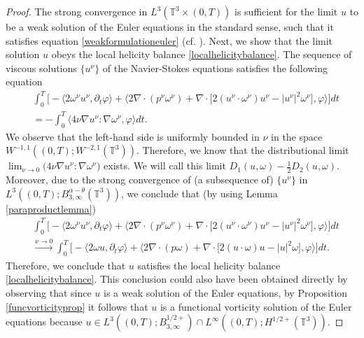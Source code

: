 \documentclass[12pt,a4paper]{article}
\theoremstyle{definition}
\theoremstyle{remark}
\numberwithin{equation}{section}
\begin{document}
\begin{proof}
The strong convergence in $L^3 (\mathbb{T}^3 \times (0,T))$ is sufficient for the limit $u$ to be a weak solution of the Euler equations in the standard sense, such that it satisfies equation \eqref{weakformulationeuler} (cf. \cite{duchon,drivaseyink}). Next, we show that the limit solution $u$ obeys the local helicity balance \eqref{localhelicitybalance}. The sequence of viscous solutions $\{ u^\nu \}$ of the Navier-Stokes equations satisfies the following equation 
\begin{align*}
&\int_0^T \bigg[ - \bigg\langle 2 \omega^\nu u^\nu, \partial_t \varphi \bigg\rangle + \bigg\langle  2 \nabla \cdot (p^\nu \omega^\nu) + \nabla \cdot \big[ 2 (u^\nu \cdot \omega^\nu) u^\nu - \lvert u^\nu \rvert^2 \omega^\nu \big], \varphi \bigg\rangle \bigg] dt  \\
&= - \int_0^T \bigg\langle 4 \nu \nabla u^\nu : \nabla \omega^\nu ,  \varphi \bigg\rangle dt. 
\end{align*}
We observe that the left-hand side is uniformly bounded in $\nu$ in the space $W^{-1,1} ((0,T); W^{-2,1} (\mathbb{T}^3))$. Therefore, we know that the distributional limit $\lim_{\nu \rightarrow 0} \big( 4 \nu \nabla u^\nu : \nabla \omega^\nu \big)$ exists. We will call this limit $D_1 (u,\omega) - \frac{1}{2} D_2 (u, \omega)$. Moreover, due to the strong convergence of (a subsequence of) $\{ u^\nu \}$ in $L^3 ((0,T);B^{\alpha - \theta}_{3,\infty} (\mathbb{T}^3))$, we conclude that (by using Lemma \ref{paraproductlemma})
\begin{align*}
&\int_0^T \bigg[ - \bigg\langle 2 \omega^\nu u^\nu, \partial_t \varphi \bigg\rangle + \bigg\langle  2 \nabla \cdot (p^\nu \omega^\nu) + \nabla \cdot \big[ 2 (u^\nu \cdot \omega^\nu) u^\nu - \lvert u^\nu \rvert^2 \omega^\nu \big], \varphi \bigg\rangle \bigg] dt \\
&\xrightarrow[]{\nu \rightarrow 0} \int_0^T \bigg[ - \bigg\langle 2 \omega u, \partial_t \varphi \bigg\rangle + \bigg\langle  2 \nabla \cdot (p \omega) + \nabla \cdot \big[ 2 (u \cdot \omega) u - \lvert u \rvert^2 \omega \big], \varphi \bigg\rangle \bigg] dt.
\end{align*}
Therefore, we conclude that $u$ satisfies the local helicity balance \eqref{localhelicitybalance}. This conclusion could also have been obtained directly by observing that since $u$ is a weak solution of the Euler equations, by Proposition \ref{funcvorticityprop} it follows that $u$ is a functional vorticity solution of the Euler equations because $u \in L^3 ((0,T); B^{1/2+}_{3,\infty}) \cap L^\infty ((0,T); H^{1/2+} (\mathbb{T}^3))$. 


\end{proof}
\end{document}

